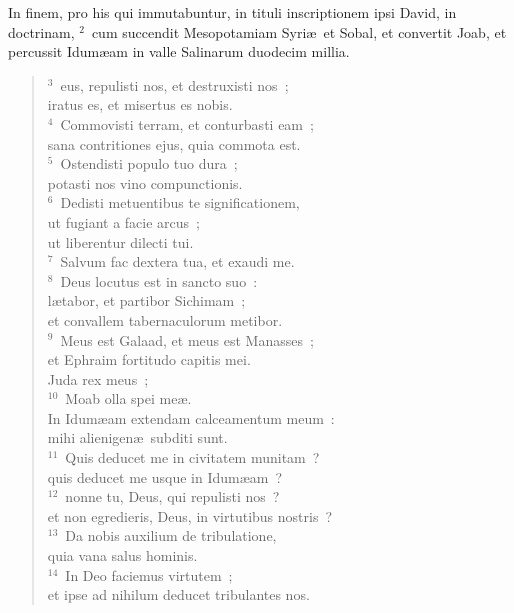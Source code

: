 \bchapter[Psalm]
In finem, pro his qui immutabuntur, in tituli inscriptionem ipsi David, in doctrinam,
${}^{2}$~cum succendit Mesopotamiam Syri\ae\ et Sobal, et convertit Joab, et percussit Idum\ae am in valle Salinarum duodecim millia.
\begin{verse}${}^{3}$~eus, repulisti nos, et destruxisti nos~;\\ iratus es, et misertus es nobis.\\
${}^{4}$~Commovisti terram, et conturbasti eam~;\\ sana contritiones ejus, quia commota est.\\
${}^{5}$~Ostendisti populo tuo dura~;\\ potasti nos vino compunctionis.\\
${}^{6}$~Dedisti metuentibus te significationem,\\ ut fugiant a facie arcus~;\\ ut liberentur dilecti tui.\\
${}^{7}$~Salvum fac dextera tua, et exaudi me.\\
${}^{8}$~Deus locutus est in sancto suo~:\\ l\ae tabor, et partibor Sichimam~;\\ et convallem tabernaculorum metibor.\\
${}^{9}$~Meus est Galaad, et meus est Manasses~;\\ et Ephraim fortitudo capitis mei.\\ Juda rex meus~;\\
${}^{10}$~Moab olla spei me\ae .\\ In Idum\ae am extendam calceamentum meum~:\\ mihi alienigen\ae\ subditi sunt.\\
${}^{11}$~Quis deducet me in civitatem munitam~?\\ quis deducet me usque in Idum\ae am~?\\
${}^{12}$~nonne tu, Deus, qui repulisti nos~?\\ et non egredieris, Deus, in virtutibus nostris~?\\
${}^{13}$~Da nobis auxilium de tribulatione,\\ quia vana salus hominis.\\
${}^{14}$~In Deo faciemus virtutem~;\\ et ipse ad nihilum deducet tribulantes nos.\end{verse}



